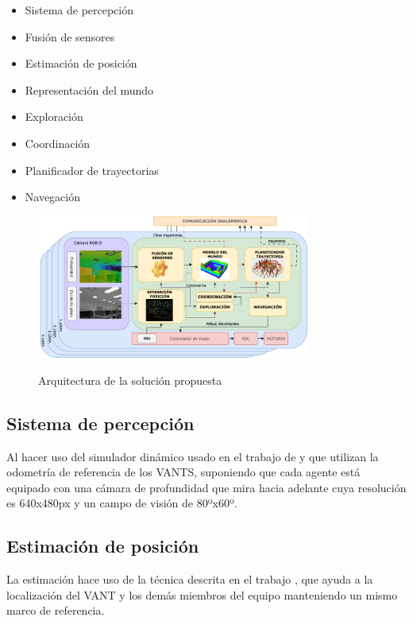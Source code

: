 \begin{itemize}\setlength{\itemsep}{-1mm}
\item Sistema de percepción
\item Fusión de sensores
\item Estimación de posición
\item Representación del mundo
\item Exploración
\item Coordinación
\item Planificador de trayectorias
\item Navegación
\end{itemize}

\begin{figure}[h]
\centering
\includegraphics[width=0.8\textwidth]{images/arquitectura}\\
\caption{Arquitectura de la solución propuesta}
\end{figure}

\subsection*{Sistema de percepción}

Al hacer uso del simulador dinámico usado en el trabajo de \citeauthor{RACER2022} y \citeauthor{BARTOLOMEI2023} que utilizan la odometría de referencia de los VANTS, suponiendo que cada agente está equipado con una
cámara de profundidad que mira hacia adelante cuya resolución es 640x480px y un campo de visión de 80ºx60º.

\subsection*{Estimación de posición}
La estimación hace uso de la técnica descrita en el trabajo \citeauthor{OMNI2022}, que ayuda a la localización del VANT y los demás miembros del equipo manteniendo un mismo marco de referencia.

